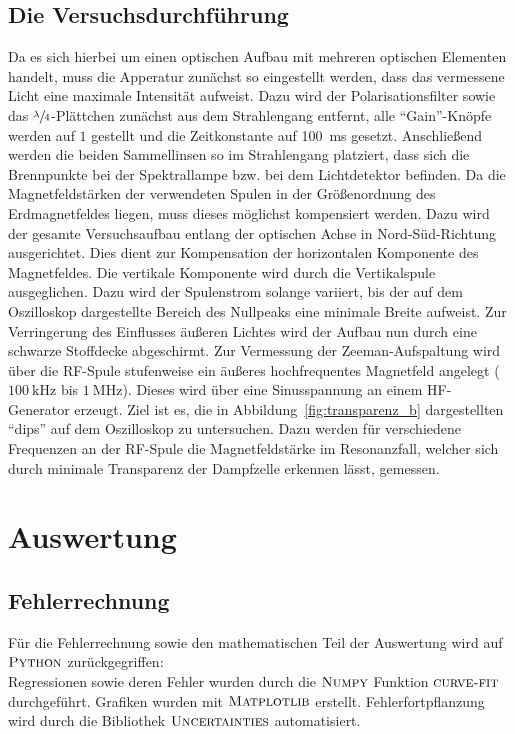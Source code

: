 \documentclass[
  bibliography=totoc,     %
  captions=tableheading,  %
  titlepage=firstiscover, %
]{scrartcl}
\begin{document}
\subsection{Die Versuchsdurchführung}
Da es sich hierbei um einen optischen Aufbau mit mehreren optischen Elementen
handelt, muss die Apperatur zunächst so eingestellt werden, dass das vermessene
Licht eine maximale Intensität aufweist. Dazu wird der Polarisationsfilter
sowie das $\sfrac{\lambda}{4}$-Plättchen zunächst aus dem Strahlengang entfernt,
alle \enquote{Gain}-Knöpfe werden auf $1$ gestellt und die Zeitkonstante auf
\SI{100}{\milli\second} gesetzt. Anschließend werden die beiden Sammellinsen
so im Strahlengang platziert, dass sich die Brennpunkte bei der Spektrallampe
bzw. bei dem Lichtdetektor befinden.
Da die Magnetfeldstärken der verwendeten Spulen in der Größenordnung des
Erdmagnetfeldes liegen, muss dieses möglichst kompensiert werden. Dazu wird der
gesamte Versuchsaufbau entlang der optischen Achse in Nord-Süd-Richtung
ausgerichtet. Dies dient zur Kompensation der horizontalen Komponente des
Magnetfeldes. Die vertikale Komponente wird durch die Vertikalspule
ausgeglichen. Dazu wird der Spulenstrom solange variiert, bis der auf dem
Oszilloskop dargestellte Bereich des Nullpeaks eine minimale Breite aufweist.
Zur Verringerung des Einflusses äußeren Lichtes wird der Aufbau nun durch eine
schwarze Stoffdecke abgeschirmt.
\noindent
Zur Vermessung der Zeeman-Aufspaltung wird über die RF-Spule stufenweise ein äußeres
hochfrequentes Magnetfeld angelegt ($\SI{100}{\kilo\hertz}$ bis $\SI{1}{\mega\hertz}$).
Dieses wird über eine Sinusspannung an einem HF-Generator erzeugt. Ziel ist es, die in
Abbildung~\ref{fig:transparenz_b} dargestellten \enquote{dips} auf dem Oszilloskop
zu untersuchen. Dazu werden für verschiedene Frequenzen an der RF-Spule die
Magnetfeldstärke im Resonanzfall, welcher sich durch minimale Transparenz der
Dampfzelle erkennen lässt, gemessen.\\
\clearpage
\section{Auswertung}
\label{sec:auswertung}
\subsection{Fehlerrechnung}
  Für die Fehlerrechnung sowie den mathematischen Teil der Auswertung wird auf
  $\textsc{Python}$ zurückgegriffen:\\
  Regressionen sowie deren Fehler wurden durch die $\textsc{Numpy}$ \cite{numpy} Funktion
  $\textsc{curve-fit}$ durchgeführt. Grafiken wurden mit $\textsc{Matplotlib}$ \cite{matplotlib}
  erstellt.
  Fehlerfortpflanzung wird durch die Bibliothek
  $\textsc{Uncertainties}$ \cite{uncertainties} automatisiert.
\end{document}
